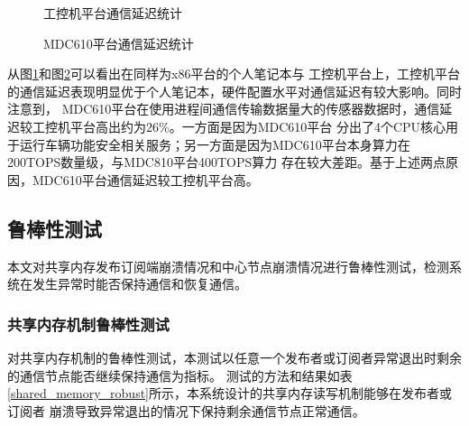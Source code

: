 \begin{figure}[H]
  \centering
  \caption{工控机平台通信延迟统计}
  \label{x86_latency_statistic}
\end{figure}

\begin{figure}[H]
  \centering
  \caption{MDC610平台通信延迟统计}
  \label{mdc_latency_statistic}
\end{figure}

从图\ref{x86_latency_statistic}和图\ref{mdc_latency_statistic}可以看出在同样为x86平台的个人笔记本与
工控机平台上，工控机平台的通信延迟表现明显优于个人笔记本，硬件配置水平对通信延迟有较大影响。同时注意到，
MDC610平台在使用进程间通信传输数据量大的传感器数据时，通信延迟较工控机平台高出约为26\%。一方面是因为MDC610平台
分出了4个CPU核心用于运行车辆功能安全相关服务；另一方面是因为MDC610平台本身算力在200TOPS数量级，与MDC810平台400TOPS算力
存在较大差距。基于上述两点原因，MDC610平台通信延迟较工控机平台高。

\subsection{鲁棒性测试}
本文对共享内存发布订阅端崩溃情况和中心节点崩溃情况进行鲁棒性测试，检测系统在发生异常时能否保持通信和恢复通信。
\subsubsection{共享内存机制鲁棒性测试}
对共享内存机制的鲁棒性测试，本测试以任意一个发布者或订阅者异常退出时剩余的通信节点能否继续保持通信为指标。
测试的方法和结果如表\ref{shared_memory_robust}所示，本系统设计的共享内存读写机制能够在发布者或订阅者
崩溃导致异常退出的情况下保持剩余通信节点正常通信。


